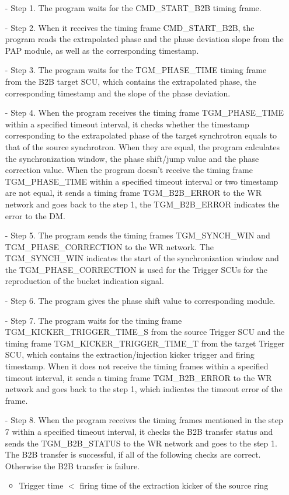 \begin{itemize}
 	\begin{itemize}
		\item[-]Step 1. The program waits for the CMD\_START\_B2B timing frame.
 		\item[-]Step 2. When it receives the timing frame CMD\_START\_B2B, the program reads the extrapolated phase and the phase deviation slope from the PAP module, as well as the corresponding timestamp.
		\item[-]Step 3. The program waits for the TGM\_PHASE\_TIME timing frame from the B2B target SCU, which contains the extrapolated phase, the corresponding timestamp and the slope of the phase deviation.
		\item[-]Step 4. When the program receives the timing frame TGM\_PHASE\_TIME within a specified timeout interval, it checks whether the timestamp corresponding to the extrapolated phase of the target synchrotron equals to that of the source synchrotron. When they are equal, the program calculates the synchronization window, the phase shift/jump value and the phase correction value. When the program doesn't receive the timing frame TGM\_PHASE\_TIME within a specified timeout interval or two timestamp are not equal, it sends a timing frame TGM\_B2B\_ERROR to the WR network and goes back to the step 1, the TGM\_B2B\_ERROR indicates the error to the DM.  
		\item[-]Step 5. The program sends the timing frames TGM\_SYNCH\_WIN and TGM\_PHASE\_CORRECTION to the WR network. The TGM\_SYNCH\_WIN indicates the start of the synchronization window and the TGM\_PHASE\_CORRECTION is used for the Trigger SCUs for the reproduction of the bucket indication signal.
		\item[-]Step 6. The program gives the phase shift value to corresponding module.
		\item[-]Step 7. The program waits for the timing frame TGM\_KICKER\_TRIGGER\_TIME\_S from the source Trigger SCU and the timing frame TGM\_KICKER\_TRIGGER\_TIME\_T from the target Trigger SCU, which contains the extraction/injection kicker trigger and firing timestamp. When it does not receive the timing frames within a specified timeout interval, it sends a timing frame TGM\_B2B\_ERROR to the WR network and goes back to the step 1, which indicates the timeout error of the frame.
		\item[-]Step 8. When the program receives the timing frames mentioned in the step 7 within a specified timeout interval, it checks the B2B transfer status and sends the TGM\_B2B\_STATUS to the WR network and goes to the step 1. The B2B transfer is successful, if all of the following checks are correct. Otherwise the B2B transfer is failure. 
\begin{itemize}
	\item Trigger time $<$ firing time of the extraction kicker of the source ring


\end{itemize}
\end{itemize}
\end{itemize}
